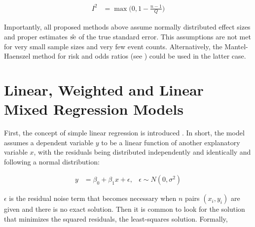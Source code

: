 \documentclass[11pt,a4paper,twoside]{book}\usepackage[]{graphicx}\usepackage[]{color}
\begin{document}
\begin{align}
I^2 &= \max\Big(0, 1 - \frac{n-1}{Q}\Big) \nonumber%
\end{align}

Importantly, all proposed methods above assume normally distributed effect sizes and proper estimates $\hat{\operatorname{se}}$ of the true standard error. This assumptions are not met for very small sample sizes and very few event counts. Alternatively, the Mantel-Haenszel method for risk and odds ratios (see \eg \citet{mantel.haenszel}) could be used in the latter case. 





\section{Linear, Weighted and Linear Mixed Regression Models} \label{sec:regression}
First, the concept of simple linear regression is introduced \citep{fahrmeir2007}. In short, the model assumes a dependent variable $y$ to be a linear function of another explanatory variable $x$, with the residuals being distributed independently and identically and following a normal distribution:

\begin{align}
y &= \beta_0 + \beta_1 x + \epsilon, & \epsilon \sim N(0, \sigma^2) \label{eq:simple.regression}
\end{align}

$\epsilon$ is the residual noise term that becomes necessary when $n$ pairs $(x_i, y_i)$ are given and there is no exact solution. Then it is common to look for the solution that minimizes the squared residuals, the least-squares solution. Formally,
\end{document}
